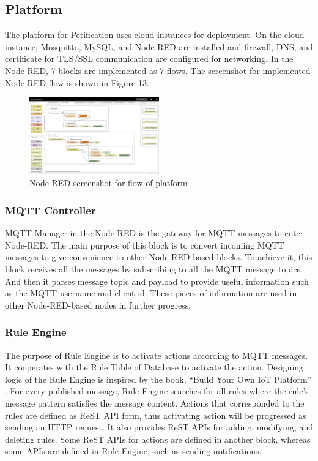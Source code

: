 \documentclass[conference]{IEEEtran}
\begin{document}
\subsection{Platform}
The platform for Petification uses cloud instances for deployment. On the cloud instance, Mosquitto, MySQL, and Node-RED are installed and firewall, DNS, and certificate for TLS/SSL communication are configured for networking. In the Node-RED, 7 blocks are implemented as 7 flows. The screenshot for implemented Node-RED flow is shown in Figure 13.

\begin{figure}[htbp]
\centerline{\includegraphics[width=0.5\textwidth]{./images/platformImpl.png}}
\caption{Node-RED screenshot for flow of platform}
\label{fig}
\end{figure}

\subsubsection{MQTT Controller}
MQTT Manager in the Node-RED is the gateway for MQTT messages to enter Node-RED. The main purpose of this block is to convert incoming MQTT messages to give convenience to other Node-RED-based blocks. To achieve it, this block receives all the messages by subscribing to all the MQTT message topics. And then it parses message topic and payload to provide useful information such as the MQTT username and client id. These pieces of information are used in other Node-RED-based nodes in further progress.

\subsubsection{Rule Engine}
The purpose of Rule Engine is to activate actions according to MQTT messages. It cooperates with the Rule Table of Database to activate the action. Designing logic of the Rule Engine is inspired by the book, “Build Your Own IoT Platform” \cite{b22}. For every published message, Rule Engine searches for all rules where the rule’s message pattern satisfies the message content. Actions that corresponded to the rules are defined as ReST API form, thus activating action will be progressed as sending an HTTP request. It also provides ReST APIs for adding, modifying, and deleting rules. Some ReST APIs for actions are defined in another block, whereas some APIs are defined in Rule Engine, such as sending notifications.
\end{document}
